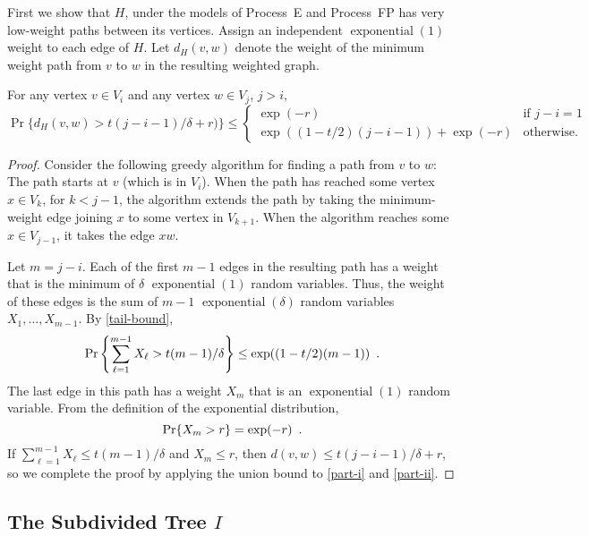 \documentclass[lotsofwhite]{patmorin}
\DeclareMathOperator{\exponential}{exponential}
\begin{document}
First we show that $H$, under the models of Process~E and Process~FP
has very low-weight paths between its vertices.
Assign an independent $\exponential(1)$ weight to each edge of $H$.
Let $d_H(v,w)$ denote the weight of the minimum weight path from $v$
to $w$ in the resulting weighted graph.

\begin{lem}
   For any vertex $v\in V_i$ and any vertex $w\in V_j$, $j>i$,
   \[
       \Pr\{d_H(v,w) > t(j-i-1)/\delta + r) \} \le
       \begin{cases}
           \exp(-r) & \text{if $j-i=1$} \\
           \exp((1-t/2)(j-i-1)) + \exp(-r) & \text{otherwise.}
       \end{cases}
   \]
\end{lem}

\begin{proof}
   Consider the following greedy algorithm for finding a path from $v$
   to $w$: The path starts at $v$ (which is in $V_i$).  When the path
   has reached some vertex $x\in V_{k}$, for $k<j-1$, the algorithm
   extends the path by taking the minimum-weight edge joining $x$ to some
   vertex in $V_{k+1}$.  When the algorithm reaches some $x\in V_{j-1}$,
   it takes the edge $xw$.

   Let $m=j-i$.  Each of the first $m-1$ edges in the resulting path
   has a weight that is the minimum of $\delta$ $\exponential(1)$
   random variables.  Thus, the weight of these edges is the sum of
   $m-1$ $\exponential(\delta)$ random variables $X_1,\ldots,X_{m-1}$.
   By \eqref{tail-bound},
   \begin{equation}
     \Pr\left\{\sum_{\ell=1}^{m-1} X_\ell > t(m-1)/\delta \right\} \le 
        \exp((1-t/2)(m-1)) \enspace .  \eqlabel{part-i}
   \end{equation}
   The last edge in this path has a weight $X_m$ that is an
   $\exponential(1)$ random variable.  From the definition
   of the exponential distribution,
   \begin{equation}
      \Pr\{X_m > r\} = \exp(-r) \enspace . \eqlabel{part-ii}
   \end{equation}
   If $\sum_{\ell=1}^{m-1} X_\ell \le t(m-1)/\delta$ and $X_m \le r$, then
   $d(v,w)\le t(j-i-1)/\delta + r$, so we complete the proof by 
   applying the union bound to \eqref{part-i} and \eqref{part-ii}.
\end{proof}

\subsection{The Subdivided Tree $I$}
\end{document}
